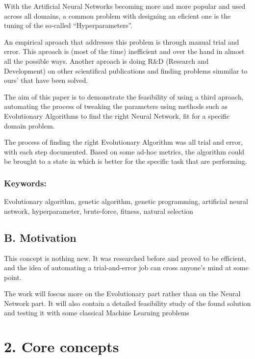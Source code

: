 \documentclass[11pt]{article}
\begin{document}
With the Artificial Neural Networks becoming more and more popular and
used across all domains, a common problem with designing an eficient one
is the tuning of the so-called ``Hyperparameters''.

An empirical aproach that addresses this problem is through manual trial
and error. This aproach is (most of the time) inefficient and over the
hand in almost all the possible ways. Another aproach is doing R\&D
(Research and Development) on other scientifical publications and
finding problems simmilar to ours' that have been solved.

The aim of this paper is to demonstrate the feasibility of using a third
aproach, automating the process of tweaking the parameters using methods
such as Evolutionary Algorithms to find the right Neural Network, fit
for a specific domain problem.

The process of finding the right Evolutionary Algorithm was all trial
and error, with each step documented. Based on some ad-hoc metrics, the
algorithm could be brought to a state in which is better for the
specific task that are performing.

\hypertarget{keywords}{%
\subsubsection{Keywords:}\label{keywords}}

Evolutionary algorithm, genetic algorithm, genetic programming,
artificial neural network, hyperparameter, brute-force, fitness, natural
selection

    \hypertarget{b.-motivation}{%
\subsection{B. Motivation}\label{b.-motivation}}

    This concept is nothing new. It was researched before and proved to be
efficient, and the idea of automating a trial-and-error job can cross
anyone's mind at some point.

The work will foscus more on the Evolutionary part rather than on the
Neural Network part. It will also contain a detailed feasibility study
of the found solution and testing it with some classical Machine
Learning problems

    \hypertarget{core-concepts}{%
\section{2. Core concepts}\label{core-concepts}}
\end{document}
